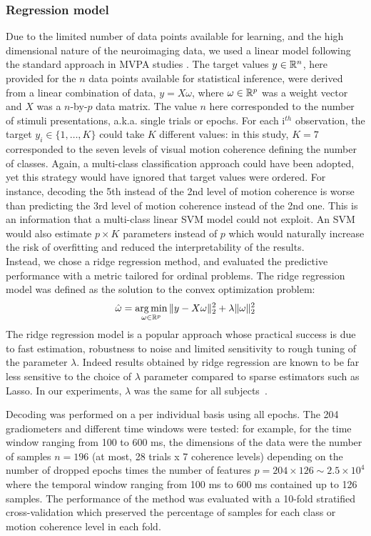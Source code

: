 \subsubsection*{Regression model}
Due to the limited number of data points available for learning, and the high dimensional nature of the neuroimaging data, we used a linear model following the standard approach in MVPA studies
\cite{5kamitani2005decoding,20mitchell2008predicting,11haynes2015primer}. The target values $y\in\mathbb{R}^n$, here provided for the $n$ data points available for statistical inference, were derived from a linear combination of data, $y=X\omega$, where $\omega\in\mathbb{R}^p$ was a weight vector and $X$ was a $n$-by-$p$ data matrix. The value $n$ here corresponded to the number of stimuli presentations, a.k.a. single trials or epochs. For each i$^{th}$ observation, the target $y_i\in\{1,\dots,K\}$ could take $K$ different values: in this study, $K=7$ corresponded to the seven levels of visual motion coherence defining the number of classes. Again, a multi-class classification approach could have been adopted, yet this strategy would have ignored that target values were ordered. For instance, decoding the 5th instead of the 2nd level of motion coherence is worse than predicting the 3rd level of motion coherence instead of the 2nd one. This is an information that a multi-class linear SVM model could not exploit. An SVM would also estimate $p\times K$ parameters instead of $p$ which would naturally increase the risk of overfitting and reduced the interpretability of the results.\\
Instead, we chose a ridge regression method, and evaluated the predictive performance with a metric tailored for ordinal problems. The ridge regression model was defined as the solution to the convex optimization problem:
\begin{equation}
	\hat{\omega} = \mathop{\mathrm{arg}\,\mathrm{min}}_{\omega\in\mathbb{R}^p}\|y-X\omega\|_2^2 + \lambda\|\omega\|_2^2
\end{equation}
The ridge regression model is a popular approach whose practical success is due to fast estimation, robustness to noise and limited sensitivity to rough tuning of the parameter $\lambda$. Indeed results obtained by ridge regression are known to be far less sensitive to the choice of $\lambda$ parameter compared to sparse estimators such as Lasso. In our experiments, $\lambda$ was the same for all subjects~\cite{Varoquaux2017166}.

Decoding was  performed on a per individual basis using all epochs. The 204 gradiometers and different time windows were tested: for example, for the time window ranging from 100 to 600 ms, the dimensions of the data were the number of samples $n=196$ (at most, 28 trials x 7 coherence levels) depending on the number of dropped epochs times the number of features $p=204 \times 126 \sim 2.5 \times 10^4$ where the temporal window ranging from 100 ms to 600 ms contained up to 126 samples. The performance of the method was evaluated with a 10-fold stratified cross-validation which preserved the percentage of samples for each class or motion coherence level in each fold.

